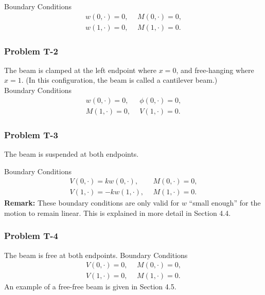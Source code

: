 \documentclass[../../main.tex]{subfiles}
\begin{document}
    {Boundary Conditions}\\
    \begin{eqnarray*}
        w(0,\cdot) = 0, \ \ &M(0,\cdot) = 0, \label{eq:1D_Model:ProblemT1BC1}\\
        w(1,\cdot) = 0, \ \ &M(1,\cdot) = 0. \label{eq:1D_Model:ProblemT1BC2}
    \end{eqnarray*}

    \subsubsection*{Problem T-2}\label{sssec:1D_Model:ProblemT2}
    The beam is clamped at the left endpoint where $x = 0$, and free-hanging where $x = 1$. (In this configuration, the beam is called a cantilever beam.)\\

    {Boundary Conditions}\\
    \begin{eqnarray*}
        w(0,\cdot) = 0, \ \ &\phi(0,\cdot) = 0, \label{eq:1D_Model:ProblemT2BC1}\\
        M(1,\cdot) = 0, \ \ &V(1,\cdot) = 0. \label{eq:1D_Model:ProblemT2BC2}
    \end{eqnarray*}

    \subsubsection*{Problem T-3}\label{sssec:1D_Model:ProblemT3}
    The beam is suspended at both endpoints.

            {Boundary Conditions}\\
    \begin{eqnarray*}
        V(0,\cdot) = k w(0,\cdot), \ \ &M(0,\cdot) = 0, \label{eq:1D_Model:ProblemT3BC1}\\
        V(1,\cdot) = -kw(1,\cdot), \ \ &M(1,\cdot) = 0. \label{eq:1D_Model:ProblemT3BC2}
    \end{eqnarray*}
    \textbf{Remark:} These boundary conditions are only valid for $w$ ``small enough'' for the motion to remain linear. This is explained in more detail in Section 4.4.

    \subsubsection*{Problem T-4}\label{sssec:1D_Model:ProblemT4}
    The beam is free at both endpoints.
            {Boundary Conditions}\\
    \begin{eqnarray*}
        V(0,\cdot) = 0, \ \ &M(0,\cdot) = 0, \label{eq:1D_Model:ProblemT4BC1}\\
        V(1,\cdot) = 0, \ \ &M(1,\cdot) = 0. \label{eq:1D_Model:ProblemT4BC2}
    \end{eqnarray*}
    An example of a free-free beam is given in Section 4.5.
\end{document}
